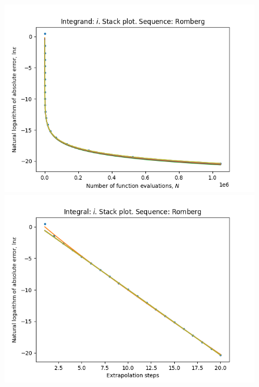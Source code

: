 \begin{figure}[H]
\centering
\begin{minipage}{0.45\textwidth}
\centering
\includegraphics[scale=0.45]{../results/romberg_plots/circle_area_hp_romberg_stack.png}
\end{minipage}
\begin{minipage}{0.45\textwidth}
\centering
\includegraphics[scale=0.45]{../results/romberg_plots/circle_area_hp_romberg_steps_stack.png}
\end{minipage}
\end{figure}

